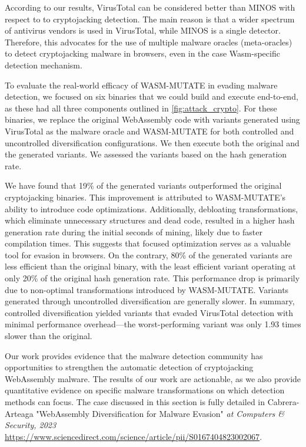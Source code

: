 \begin{tcolorbox}[title=Takeaway,boxrule=1pt,arc=.2em,boxsep=1.0mm]
    According to our results, VirusTotal can be considered better than MINOS with respect to to cryptojacking detection. 
    The main reason is that a wider spectrum of antivirus vendors is used in VirusTotal, while MINOS is a single detector.
    Therefore, this advocates for the use of multiple malware oracles (meta-oracles) to detect cryptojacking malware in browsers, even in the case Wasm-specific detection mechanism.
\end{tcolorbox}





 To evaluate the real-world efficacy of WASM-MUTATE in evading malware detection, we focused on six binaries that we could build and execute end-to-end, as these had all three components outlined in \autoref{fig:attack_crypto}. 
For these binaries, we replace the original WebAssembly code with variants generated using VirusTotal as the malware oracle and WASM-MUTATE for both controlled and uncontrolled diversification configurations. 
We then execute both the original and the generated variants. 
We assessed the variants based on the hash generation rate.

We have found that 19\% of the generated variants outperformed the original cryptojacking binaries. 
This improvement is attributed to WASM-MUTATE's ability to introduce code optimizations. 
Additionally, debloating transformations, which eliminate unnecessary structures and dead code, resulted in a higher hash generation rate during the initial seconds of mining, likely due to faster compilation times. 
This suggests that focused optimization serves as a valuable tool for evasion in browsers.
On the contrary, 80\% of the generated variants are less efficient than the original binary, with the least efficient variant operating at only 20\% of the original hash generation rate. 
This performance drop is primarily due to non-optimal transformations introduced by WASM-MUTATE. 
Variants generated through uncontrolled diversification are generally slower.
In summary, controlled diversification yielded variants that evaded VirusTotal detection with minimal performance overhead—the worst-performing variant was only 1.93 times slower than the original.


\begin{tcolorbox}[title=Contribution paper,boxrule=1pt,arc=.2em,boxsep=1.0mm]
    Our work provides evidence that the malware detection community has opportunities to strengthen the automatic detection of cryptojacking WebAssembly malware. 
    The results of our work are actionable, as we also provide quantitative evidence on specific malware transformations on which detection methods can focus. 
    The case discussed in this section is fully detailed in Cabrera-Arteaga \etal "WebAssembly Diversification for Malware Evasion"
    \emph{at Computers \& Security, 2023}
    \url{https://www.sciencedirect.com/science/article/pii/S0167404823002067}. 
\end{tcolorbox}
